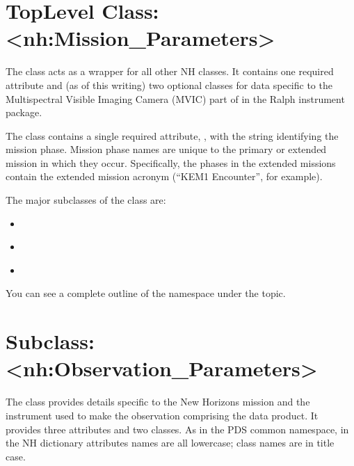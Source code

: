 \documentclass[letterpaper,10pt,english]{sphinxmanual}
\begin{document}
\section{Top\sphinxhyphen{}Level Class: \textless{}nh:Mission\_Parameters\textgreater{}}
\label{\detokenize{user/user-guide:top-level-class-nh-mission-parameters}}
\sphinxAtStartPar
The  class acts as a wrapper for all other NH classes.
It contains one required attribute and (as of this writing) two optional classes
for data specific to the Multispectral Visible Imaging Camera (MVIC) part of
in the Ralph instrument package.

\sphinxAtStartPar
The class contains a single required attribute, , with the
string identifying the mission phase. Mission phase names are unique to the
primary or extended mission in which they occur. Specifically, the phases in the
extended missions contain the extended mission acronym (“KEM1 Encounter”, for
example).

\sphinxAtStartPar
The major subclasses of the  class are:
\begin{itemize}
\item {} 
\sphinxAtStartPar
{\hyperref[\detokenize{user/user-guide:observation-parameters}]{}}

\item {} 
\sphinxAtStartPar
{\hyperref[\detokenize{user/user-guide:mvic-calibration-information}]{}}

\item {} 
\sphinxAtStartPar
{\hyperref[\detokenize{user/user-guide:radiometric-conversion-constants}]{}}

\end{itemize}

\sphinxAtStartPar
You can see a complete outline of the namespace under the
{\hyperref[\detokenize{detailed/outline::doc}]{}} topic.


\section{Subclass: \textless{}nh:Observation\_Parameters\textgreater{}}
\label{\detokenize{user/user-guide:subclass-nh-observation-parameters}}\label{\detokenize{user/user-guide:observation-parameters}}
\sphinxAtStartPar
The  class provides details specific to the New
Horizons mission and the instrument used to make the observation comprising the
data product. It provides three attributes and two classes. As in the PDS
common namespace, in the NH dictionary attributes names are all lowercase;
class names are in title case.
\end{document}
